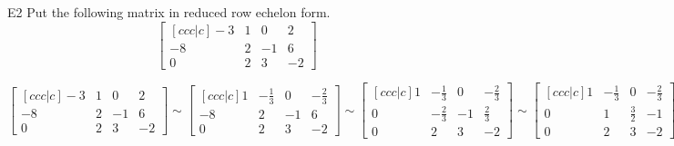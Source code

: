 \begin{problem}{E2}
Put the following matrix in reduced row echelon form.
$$\begin{bmatrix}[ccc|c] -3 & 1 & 0 & 2 \\ -8 & 2 & -1 & 6 \\ 0 & 2 & 3 & -2 \end{bmatrix}$$
\end{problem}
\begin{solution}
$$\begin{bmatrix}[ccc|c]
-3 & 1 & 0 & 2 \\
 -8 & 2 & -1 & 6 \\
 0 & 2 & 3 & -2
\end{bmatrix} \sim
\begin{bmatrix}[ccc|c]
1 & -\frac{1}{3} & 0 & -\frac{2}{3} \\
 -8 & 2 & -1 & 6 \\
 0 & 2 & 3 & -2
\end{bmatrix} \sim
\begin{bmatrix}[ccc|c]
1 & -\frac{1}{3} & 0 & -\frac{2}{3} \\
 0 & -\frac{2}{3} & -1 & \frac{2}{3} \\
 0 & 2 & 3 & -2
\end{bmatrix} \sim
\begin{bmatrix}[ccc|c]
1 & -\frac{1}{3} & 0 & -\frac{2}{3} \\
 0 & 1 & \frac{3}{2} & -1 \\
 0 & 2 & 3 & -2
\end{bmatrix} \sim
\begin{bmatrix}[ccc|c]
1 & 0 & \frac{1}{2} & -1 \\
 0 & 1 & \frac{3}{2} & -1 \\
 0 & 0 & 0 & 0
\end{bmatrix}$$
\end{solution}

